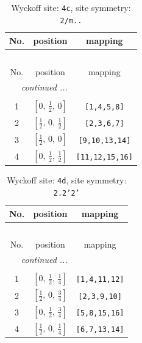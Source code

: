 \documentclass[fleqn,8pt]{jsarticle}
\begin{document}
\renewcommand{\arraystretch}{1.2}
\begin{longtable}{ccc}
\caption{Wyckoff site: {\tt 4c}, site symmetry: {\tt 2/m..}}
 \\
 \hline \hline
No. & position & mapping \\ \hline \endfirsthead

\multicolumn{2}{l}{\tablename\ \thetable{}} \\
 \hline \hline
No. & position & mapping \\ \hline \endhead

 \hline \hline
\multicolumn{2}{r}{\footnotesize\it continued ...} \\ \endfoot

 \hline \hline
\multicolumn{2}{r}{} \\ \endlastfoot

1 & $\left[ 0,\, \frac{1}{2},\, 0 \right]$ & {\tt [1,4,5,8]} \\ \hline
2 & $\left[ \frac{1}{2},\, 0,\, \frac{1}{2} \right]$ & {\tt [2,3,6,7]} \\ \hline
3 & $\left[ \frac{1}{2},\, 0,\, 0 \right]$ & {\tt [9,10,13,14]} \\ \hline
4 & $\left[ 0,\, \frac{1}{2},\, \frac{1}{2} \right]$ & {\tt [11,12,15,16]} \\
\end{longtable}
\renewcommand{\arraystretch}{1.2}
\begin{longtable}{ccc}
\caption{Wyckoff site: {\tt 4d}, site symmetry: {\tt 2.2'2'}}
 \\
 \hline \hline
No. & position & mapping \\ \hline \endfirsthead

\multicolumn{2}{l}{\tablename\ \thetable{}} \\
 \hline \hline
No. & position & mapping \\ \hline \endhead

 \hline \hline
\multicolumn{2}{r}{\footnotesize\it continued ...} \\ \endfoot

 \hline \hline
\multicolumn{2}{r}{} \\ \endlastfoot

1 & $\left[ 0,\, \frac{1}{2},\, \frac{1}{4} \right]$ & {\tt [1,4,11,12]} \\ \hline
2 & $\left[ \frac{1}{2},\, 0,\, \frac{3}{4} \right]$ & {\tt [2,3,9,10]} \\ \hline
3 & $\left[ 0,\, \frac{1}{2},\, \frac{3}{4} \right]$ & {\tt [5,8,15,16]} \\ \hline
4 & $\left[ \frac{1}{2},\, 0,\, \frac{1}{4} \right]$ & {\tt [6,7,13,14]} \\
\end{longtable}
\end{document}
